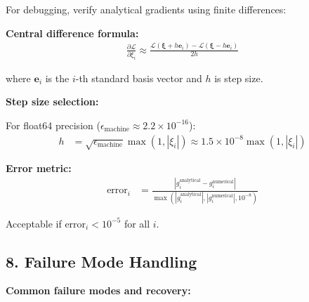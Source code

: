 \documentclass[11pt]{article}
\begin{document}
For debugging, verify analytical gradients using finite differences:

\textbf{Central difference formula:}
\begin{align}
\frac{\partial \mathcal{L}}{\partial \xi_i} \approx \frac{\mathcal{L}(\bm{\xi} + h \bm{e}_i) - \mathcal{L}(\bm{\xi} - h \bm{e}_i)}{2h}
\end{align}

where $\bm{e}_i$ is the $i$-th standard basis vector and $h$ is step size.

\textbf{Step size selection:}

For float64 precision ($\epsilon_{\text{machine}} \approx 2.2 \times 10^{-16}$):
\begin{align}
h &= \sqrt{\epsilon_{\text{machine}}} \max(1, |\xi_i|) \approx 1.5 \times 10^{-8} \max(1, |\xi_i|)
\end{align}

\textbf{Error metric:}
\begin{align}
\text{error}_i &= \frac{|g_i^{\text{analytical}} - g_i^{\text{numerical}}|}{\max(|g_i^{\text{analytical}}|, |g_i^{\text{numerical}}|, 10^{-8})}
\end{align}

Acceptable if $\text{error}_i < 10^{-5}$ for all $i$.

\subsection*{8. Failure Mode Handling}

\textbf{Common failure modes and recovery:}
\end{document}
